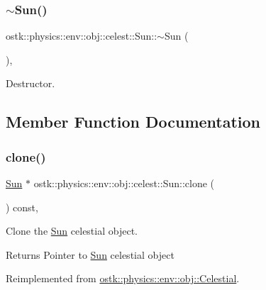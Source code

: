 \subsubsection{\texorpdfstring{$\sim$\+Sun()}{~Sun()}}
{\footnotesize\ttfamily ostk\+::physics\+::env\+::obj\+::celest\+::\+Sun\+::$\sim$\+Sun (\begin{DoxyParamCaption}{ }\end{DoxyParamCaption})\hspace{0.3cm}{\ttfamily [override]}, {\ttfamily [virtual]}}



Destructor. 



\subsection{Member Function Documentation}
\mbox{\label{classostk_1_1physics_1_1env_1_1obj_1_1celest_1_1_sun_a57fd7c3c48115f77e2d3d331ef0e8e0a}} 
\subsubsection{\texorpdfstring{clone()}{clone()}}
{\footnotesize\ttfamily \hyperlink{classostk_1_1physics_1_1env_1_1obj_1_1celest_1_1_sun}{Sun} $\ast$ ostk\+::physics\+::env\+::obj\+::celest\+::\+Sun\+::clone (\begin{DoxyParamCaption}{ }\end{DoxyParamCaption}) const\hspace{0.3cm}{\ttfamily [override]}, {\ttfamily [virtual]}}



Clone the \hyperlink{classostk_1_1physics_1_1env_1_1obj_1_1celest_1_1_sun}{Sun} celestial object. 

\begin{DoxyReturn}{Returns}
Pointer to \hyperlink{classostk_1_1physics_1_1env_1_1obj_1_1celest_1_1_sun}{Sun} celestial object 
\end{DoxyReturn}


Reimplemented from \hyperlink{classostk_1_1physics_1_1env_1_1obj_1_1_celestial_a87c6f3ec3c0ec9758ae52e3edc3fc5df}{ostk\+::physics\+::env\+::obj\+::\+Celestial}.

